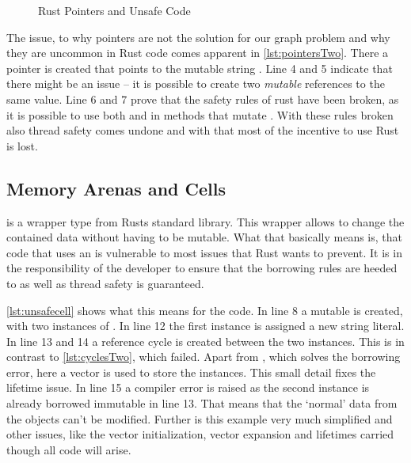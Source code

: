 \documentclass[thesis]{subfiles}
\begin{document}
    \begin{figure}[ht]
      \captionsetup{type=lstlisting}
       \hfill%
      \caption{Rust Pointers and Unsafe Code}\label{lst:pointers}
    \end{figure}

    The issue, to why pointers are not the solution for our graph problem and why they are uncommon in Rust code comes apparent in \autoref{lst:pointersTwo}.
    There a pointer  is created that points to the mutable string .
    Line 4 and 5 indicate that there might be an issue -- it is possible to create two \emph{mutable} references to the same value.
    Line 6 and 7 prove that the safety rules of rust have been broken, as it is possible to use both  and  in methods that mutate .
    With these rules broken also thread safety comes undone and with that most of the incentive to use Rust is lost.

  \subsection{Memory Arenas and Cells}\label{sec:cell}
     is a wrapper type from Rusts standard library.
    This wrapper allows to change the contained data without having to be mutable.
    What that basically means is, that code that uses an  is vulnerable to most issues that Rust wants to prevent.
    It is in the responsibility of the developer to ensure that the borrowing rules are heeded to as well as thread safety is guaranteed.\autocite{rust-doc}

    \autoref{lst:unsafecell} shows what this means for the code.
    In line 8 a mutable  is created, with two instances of \Node.
    In line 12 the first instance is assigned a new string literal.
    In line 13 and 14 a reference cycle is created between the two  instances.
    This is in contrast to \autoref{lst:cyclesTwo}, which failed.
    Apart from , which solves the borrowing error, here a vector is used to store the \Node instances.
    This small detail fixes the lifetime issue.
    In line 15 a compiler error is raised as the second \Node instance is already borrowed immutable in line 13.
    That means that the `normal' data from the objects can't be modified.
    Further is this example very much simplified and other issues, like the vector initialization, vector expansion and lifetimes carried though all code will arise.
\end{document}
